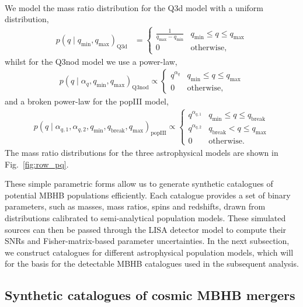 \documentclass[a4paper,12pt]{article}
\begin{document}
\paragraph{}
We model the mass ratio distribution for the Q3d model with a uniform distribution,
\begin{align}
p(q \mid q_{\min},q_{\max})_{\mathrm{Q3d}}
&=
\begin{cases}
\frac{1}{q_{\max}-q_{\min}} & q_{\min} \le q \le q_{\max}\\
0 & \mathrm{otherwise},
\end{cases}
\label{eq:massratio_Q3d}
\end{align}
whilst for the Q3nod model we use a power-law, 
\begin{align}
p(q \mid \alpha_{q},q_{\min},q_{\max})_{\mathrm{Q3nod}}
\propto
\begin{cases}
q^{\alpha_{q}} & q_{\min} \le q \le q_{\mathrm{max}}\\
0 & \mathrm{otherwise},
\end{cases}
\label{eq:mass_ratio_Q3nod}
\end{align}
and a broken power-law for the popIII model, 
\begin{align}
p(q \mid \alpha_{q,1},\alpha_{q,2},q_{\min},q_{\mathrm{break}},q_{\max})_{\mathrm{popIII}}
\propto
\begin{cases}
q^{\alpha_{q,1}} & q_{\min} \le q \le q_{\mathrm{break}}\\[6pt]
q^{\alpha_{q,2}} & q_{\mathrm{break}} < q \le q_{\max}\\
0 & \mathrm{otherwise}.
\end{cases}
\label{eq:mass_ratio_popIII}
\end{align}
The mass ratio distributions for the three astrophysical models are shown in Fig.~\ref{fig:row_pq}.

These simple parametric forms allow us to generate synthetic catalogues of potential MBHB populations efficiently. Each catalogue provides a set of binary parameters, such as masses, mass ratios, spins and redshifts, drawn from distributions calibrated to semi-analytical population models. These simulated sources can then be passed through the LISA detector model to compute their SNRs and Fisher-matrix-based parameter uncertainties. In the next subsection, we construct catalogues for different astrophysical population models, which will for the basis for the detectable MBHB catalogues used in the subsequent analysis.

\FloatBarrier
\subsection{Synthetic catalogues of cosmic MBHB mergers}
\label{subsec:synth_catalogs_intrinsic_mbhbs}
\end{document}
